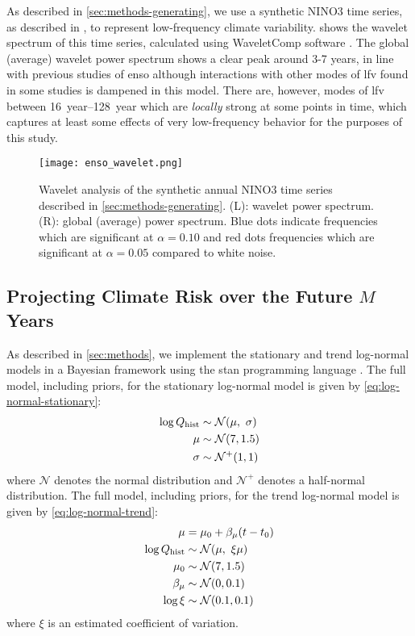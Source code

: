 \documentclass[
  draft,
  linenumbers
]{agujournal2018}
\newcommand{\normal}{\mathcal{N}}
\begin{document}
As described in \cref{sec:methods-generating}, we use a synthetic NINO3 time series, as described in \citep{Ramesh:2016hf}, to represent low-frequency climate variability.
 shows the wavelet spectrum of this time series, calculated using WaveletComp software \citep{Roesch:wlBQQoIs}.
The global (average) wavelet power spectrum shows a clear peak around 3-7 years, in line with previous studies of \gls{enso} although interactions with other modes of \acrfull{lfv} found in some studies \citep{Jin:1994wq} is dampened in this model.
There are, however, modes of \gls{lfv} between \SIrange{16}{128}{year} which are \emph{locally} strong at some points in time, which captures at least some effects of very low-frequency behavior for the purposes of this study.
\begin{figure}
  \texttt{[image: enso\_wavelet.png]}
  \caption{
    Wavelet analysis of the synthetic annual NINO3 time series described in \cref{sec:methods-generating}.
    (L): wavelet power spectrum.
    (R): global (average) power spectrum.
    Blue dots indicate frequencies which are significant at $\alpha=0.10$ and red dots frequencies which are significant at $\alpha=0.05$ compared to white noise.
  }\label{fig:enso-ts}
\end{figure}

\subsection{Projecting Climate Risk over the Future $M$ Years}

As described in \cref{sec:methods}, we implement the stationary and trend log-normal models in a Bayesian framework using the stan programming language \citep{Carpenter:2017ke}.
The full model, including priors, for the stationary log-normal model is given by \cref{eq:log-normal-stationary}:
\begin{align}\label{eq:log-normal-stationary}
  \begin{split}
    \log Q_\text{hist} & \sim \normal \qty(\mu, \ \sigma) \\
    \mu &\sim \normal \qty(7, 1.5) \\
    \sigma &\sim \normal^+ \qty(1, 1)
  \end{split}
\end{align}
where $\normal$ denotes the normal distribution and $\normal^+$ denotes a half-normal distribution.
The full model, including priors, for the trend log-normal model is given by \cref{eq:log-normal-trend}:
\begin{align}\label{eq:log-normal-trend}
  \begin{split}
    \mu &= \mu_0 + \beta_\mu \qty(t - t_0) \\
    \log Q_\text{hist} & \sim \normal \qty(\mu, \ \xi \mu) \\
    \mu_0 & \sim \normal \qty(7, 1.5) \\
    \beta_\mu & \sim \normal \qty(0, 0.1) \\
    \log \xi & \sim \normal \qty(0.1, 0.1)
  \end{split}
\end{align}
where $\xi$ is an estimated coefficient of variation.
\end{document}
